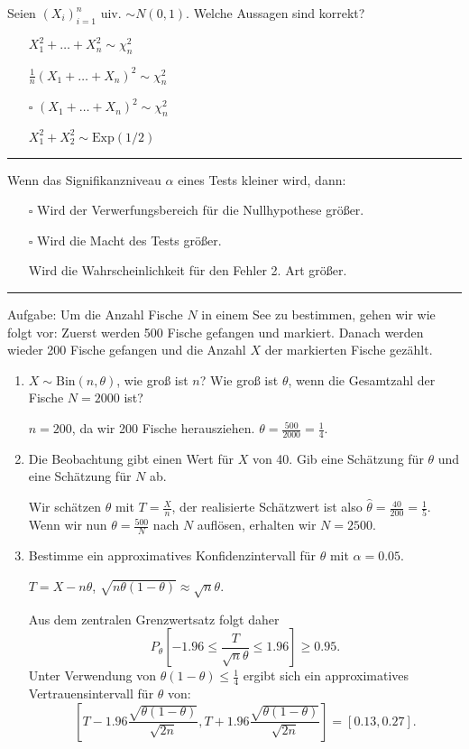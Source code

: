 \begin{tiny}
    Seien $(X_i)_{i=1}^n$ uiv. $\sim N(0, 1)$. Welche Aussagen sind korrekt?
    \begin{itemize}
        \item[\checkmark] $X_1^2 + \dots + X_n^2 \sim \chi^2_n$
        \item[\checkmark] $\frac{1}{n}(X_1 + \dots + X_n)^2 \sim \chi^2_n$
        \item[$\square$] $(X_1 + \dots + X_n)^2 \sim \chi^2_n$
        \item[\checkmark] $X_1^2 + X_2^2 \sim \text{Exp}(1/2)$
    \end{itemize}
    \rule{\linewidth}{0.4pt}

    Wenn das Signifikanzniveau $\alpha$ eines Tests kleiner wird, dann:
    \begin{itemize}
        \item[$\square$] Wird der Verwerfungsbereich für die Nullhypothese größer.
        \item[$\square$] Wird die Macht des Tests größer.
        \item[\checkmark] Wird die Wahrscheinlichkeit für den Fehler 2. Art größer.
    \end{itemize}
    \rule{\linewidth}{0.4pt}
    Aufgabe: Um die Anzahl Fische $N$ in einem See zu bestimmen, gehen wir
    wie folgt vor: Zuerst werden 500 Fische gefangen und markiert. Danach
    werden wieder 200 Fische gefangen und die Anzahl $X$ der markierten
    Fische gezählt.

    \begin{enumerate}
        \item $X \sim \text{Bin}(n, \theta)$, wie groß ist $n$? Wie groß ist $\theta$, wenn die Gesamtzahl
              der Fische $N = 2000$ ist?

              $n = 200$, da wir 200 Fische herausziehen. $\theta = \frac{500}{2000} = \frac{1}{4}$.

        \item Die Beobachtung gibt einen Wert für $X$ von 40. Gib eine Schätzung
              für $\theta$ und eine Schätzung für $N$ ab.

              Wir schätzen $\theta$ mit $T = \frac{X}{n}$, der realisierte Schätzwert ist also $\hat{\theta} = \frac{40}{200} = \frac{1}{5}$. Wenn wir nun $\theta = \frac{500}{N}$ nach $N$ auflösen, erhalten wir $N = 2500$.

        \item Bestimme ein approximatives Konfidenzintervall für $\theta$ mit $\alpha = 0.05$.

              $T = X - n\theta$, $\sqrt{n\theta(1-\theta)} \approx \sqrt{n}\theta$.

              Aus dem zentralen Grenzwertsatz folgt daher
              \[
                  P_{\theta}\left[-1.96 \leq \frac{T}{\sqrt{n}\theta} \leq 1.96\right] \geq 0.95.
              \]
              Unter Verwendung von $\theta(1 - \theta) \leq \frac{1}{4}$ ergibt sich ein approximatives Vertrauensintervall für $\theta$ von:
              \[
                  \left[T - 1.96 \frac{\sqrt{\theta(1-\theta)}}{\sqrt{2n}}, T + 1.96 \frac{\sqrt{\theta(1-\theta)}}{\sqrt{2n}}\right] = [0.13, 0.27].
              \]
    \end{enumerate}
\end{tiny}
